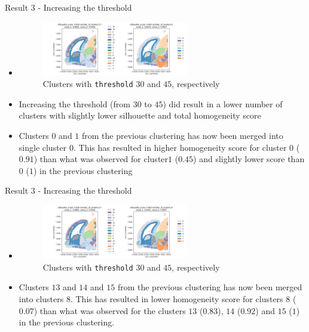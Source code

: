 \documentclass{beamer}
\begin{document}
\begin{frame}{Result 3 - Increasing the threshold}
\begin{itemize}
   \item<1-> []
   \begin{figure}
    \includegraphics[width=0.6\textwidth]{clusters_4_5.png}
    \caption{Clusters with \texttt{threshold} $30$ and $45$, respectively}
\end{figure} 
    \item<2-> Increasing the threshold (from $30$ to $45$) did result in a lower number of clusters with slightly lower silhouette and total homogeneity score
    \item<3-> Clusters $0$ and $1$ from the previous clustering has now been merged into single cluster $0$. This has resulted in higher homogeneity score for cluster $0$ ($0.91$) than what was observed for cluster$1$ ($0.45$) and slightly lower score than $0$ ($1$) in the previous clustering 
\end{itemize}


\end{frame}
\begin{frame}{Result 3 - Increasing the threshold}
\begin{itemize}
    \item<1-> []
    \begin{figure}
    \includegraphics[width=0.6\textwidth]{clusters_4_5.png}
    \caption{Clusters with \texttt{threshold} $30$ and $45$, respectively}
\end{figure} 
     \item<2-> Clusters $13$ and $14$  and $15$ from the previous clustering has now been merged into clusters $8$. This  has resulted in lower homogeneity score for clusters $8$ ($0.07$) than what was observed for the clusters $13$ ($0.83$), $14$ ($0.92$) and $15$ ($1$) in the previous clustering. 
\end{itemize}


\end{frame}
\end{document}
